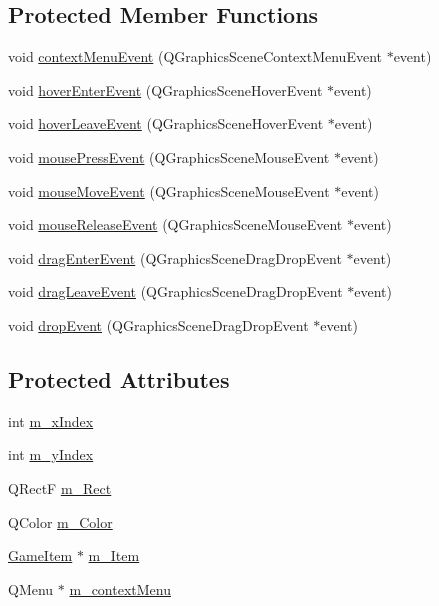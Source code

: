 \subsection*{Protected Member Functions}
\begin{DoxyCompactItemize}
\item 
void \hyperlink{class_cell_ab36897c962a4425eebb00172eb7f7430}{contextMenuEvent} (QGraphicsSceneContextMenuEvent $\ast$event)
\item 
void \hyperlink{class_cell_a522f8850a2c033f29e6a5e58ea62839c}{hoverEnterEvent} (QGraphicsSceneHoverEvent $\ast$event)
\item 
void \hyperlink{class_cell_a08aae7dc656554efc9ad59f611b384a5}{hoverLeaveEvent} (QGraphicsSceneHoverEvent $\ast$event)
\item 
void \hyperlink{class_cell_ac9cbc2f07f61fe3a0d68af7bd30e3cdf}{mousePressEvent} (QGraphicsSceneMouseEvent $\ast$event)
\item 
void \hyperlink{class_cell_ad24871a1e6c5245f4bd874dceb8f29de}{mouseMoveEvent} (QGraphicsSceneMouseEvent $\ast$event)
\item 
void \hyperlink{class_cell_a40656cc92895bfbff1a04e41d9918e51}{mouseReleaseEvent} (QGraphicsSceneMouseEvent $\ast$event)
\item 
void \hyperlink{class_cell_a5a6f351facad6a78f38fa95faa194f96}{dragEnterEvent} (QGraphicsSceneDragDropEvent $\ast$event)
\item 
void \hyperlink{class_cell_a6405bea25a6ac9731219f11878be7a29}{dragLeaveEvent} (QGraphicsSceneDragDropEvent $\ast$event)
\item 
void \hyperlink{class_cell_a4988920897ae88a79fa8192fdd55f0b5}{dropEvent} (QGraphicsSceneDragDropEvent $\ast$event)
\end{DoxyCompactItemize}
\subsection*{Protected Attributes}
\begin{DoxyCompactItemize}
\item 
int \hyperlink{class_cell_a6979d1a8ade7f0a6419fcfe4cd2be8b2}{m\_\-xIndex}
\item 
int \hyperlink{class_cell_a2307ec9f6194515d2e399a6e16dfc416}{m\_\-yIndex}
\item 
QRectF \hyperlink{class_cell_a870b275658020dc6d2cdc48beadf0b35}{m\_\-Rect}
\item 
QColor \hyperlink{class_cell_af039f663a38dac420bbe62c2f90c3bb5}{m\_\-Color}
\item 
\hyperlink{class_game_item}{GameItem} $\ast$ \hyperlink{class_cell_a493878cf970747f1596773aae325fc87}{m\_\-Item}
\item 
QMenu $\ast$ \hyperlink{class_cell_ab475b89241a718080a4511fcc91b9f2c}{m\_\-contextMenu}
\end{DoxyCompactItemize}


